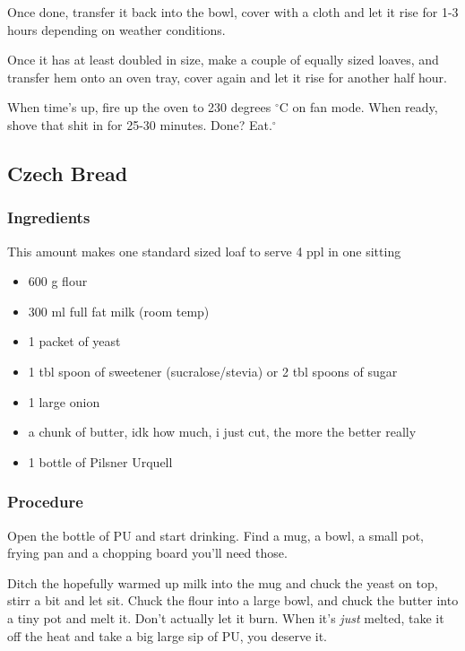 \documentclass[10pt]{article}
\begin{document}
Once done, transfer it back into the bowl, cover with a cloth and let it rise for 1-3 hours depending on weather conditions.\par

Once it has at least doubled in size, make a couple of equally sized loaves, and transfer hem onto an oven tray, cover again and let it rise for another half hour.\par

When time's up, fire up the oven to 230 degrees $^{\circ}$C on fan mode. When ready, shove that shit in for 25-30 minutes. Done? Eat.$^{\circ}$
\subsection{Czech Bread}%
\label{sub:czech_bread}

\subsubsection{Ingredients}%
\label{ssub:czech_bread_ingredients}
This amount makes one standard sized loaf to serve 4 ppl in one sitting

\begin{itemize}
	\item 600 g flour
	\item 300 ml full fat milk (room temp)
	\item 1 packet of yeast
	\item 1 tbl spoon of sweetener (sucralose/stevia) or 2 tbl spoons of sugar
	\item 1 large onion
	\item a chunk of butter, idk how much, i just cut, the more the better really
	\item 1 bottle of Pilsner Urquell
\end{itemize}
\subsubsection{Procedure}%
\label{ssub:czech_bread_procedure}

Open the bottle of PU and start drinking. Find a mug, a bowl, a small pot, frying pan and a chopping board you'll need those.\par

Ditch the hopefully warmed up milk into the mug and chuck the yeast on top, stirr a bit and let sit. Chuck the flour into a large bowl, and chuck the butter into a tiny pot and melt it. Don't actually let it burn. When it's \textit{just} melted, take it off the heat and take a big large sip of PU, you deserve it.\par
\end{document}
